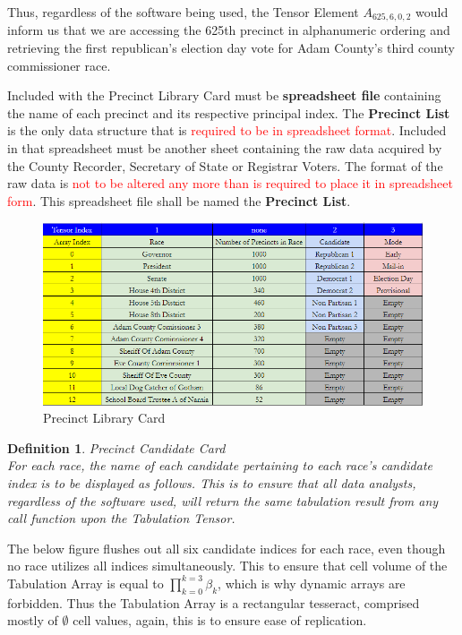 \documentclass[preprint,13pt]{elsarticle}
\newtheorem{definition}{Definition}[section]
\begin{document}
Thus, regardless of the software being used, the Tensor Element $A_{625,6,0,2}$ would inform us that we are accessing the 625th precinct in alphanumeric ordering and retrieving the first republican's election day vote for Adam County's third county commissioner race.

Included with the Precinct Library Card must be \textbf{spreadsheet file} containing the name of each precinct and its respective principal index. The \textbf{Precinct List} is the only data structure that is \textcolor{red}{required to be in spreadsheet format}. Included in that spreadsheet must be another sheet containing the raw data acquired by the County Recorder, Secretary of State or Registrar Voters. The format of the raw data is \textcolor{red}{not to be altered any more than is required to place it in spreadsheet form}. This spreadsheet file shall be named the \textbf{Precinct List}.
\begin{figure}[bp!]
\begin{center}
\caption{Precinct Library Card}
\includegraphics[width=400pt]{Precinct Library Card.png}
\end{center}
\end{figure}
\newpage
\begin{definition}{Precinct Candidate Card}\\
For each race, the name of each candidate pertaining to each race's candidate index is to be displayed as follows. This is to ensure that all data analysts, regardless of the software used, will return the same tabulation result from any call function upon the Tabulation Tensor.
\end{definition}

The below figure flushes out all six candidate indices for each race, even though no race utilizes all indices simultaneously. This to ensure that cell volume of the Tabulation Array is equal to $\prod_{k=0}^{k=3} \beta_{k}$, which is why dynamic arrays are forbidden. Thus the Tabulation Array is a rectangular tesseract, comprised mostly of $\emptyset$ cell values, again, this is to ensure ease of replication.
\end{document}
